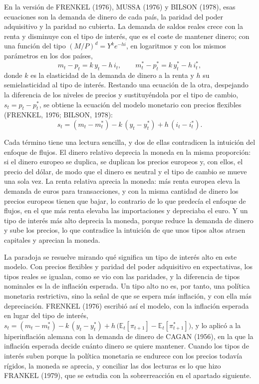 \documentclass[10pt,a4paper]{article}
\begin{document}
En la versión de FRENKEL (1976), MUSSA (1976) y BILSON (1978), esas ecuaciones son la demanda de dinero de cada país, la paridad del poder adquisitivo y la paridad no cubierta. La demanda de saldos reales crece con la renta y disminuye con el tipo de interés, que es el coste de mantener dinero; con una función del tipo $(M/P)^d=Y^k e^{-hi}$, en logaritmos y con los mismos parámetros en los dos países,
$$m_t-p_t=k\,y_t-h\,i_t,\qquad m_t^*-p_t^*=k\,y_t^*-h\,i_t^*,$$
donde $k$ es la elasticidad de la demanda de dinero a la renta y $h$ su semielasticidad al tipo de interés. Restando una ecuación de la otra, despejando la diferencia de los niveles de precios y sustituyéndola por el tipo de cambio, $s_t=p_t-p_t^*$, se obtiene la ecuación del modelo monetario con precios flexibles (FRENKEL, 1976; BILSON, 1978):
$$s_t=(m_t-m_t^*)-k\,(y_t-y_t^*)+h\,(i_t-i_t^*).$$

Cada término tiene una lectura sencilla, y dos de ellas contradicen la intuición del enfoque de flujos. El dinero relativo deprecia la moneda en la misma proporción: si el dinero europeo se duplica, se duplican los precios europeos y, con ellos, el precio del dólar, de modo que el dinero es neutral y el tipo de cambio se mueve una sola vez. La renta relativa aprecia la moneda: más renta europea eleva la demanda de euros para transacciones, y con la misma cantidad de dinero los precios europeos tienen que bajar, lo contrario de lo que predecía el enfoque de flujos, en el que más renta elevaba las importaciones y depreciaba el euro. Y un tipo de interés más alto deprecia la moneda, porque reduce la demanda de dinero y sube los precios, lo que contradice la intuición de que unos tipos altos atraen capitales y aprecian la moneda.

La paradoja se resuelve mirando qué significa un tipo de interés alto en este modelo. Con precios flexibles y paridad del poder adquisitivo en expectativas, los tipos reales se igualan, como se vio con las paridades, y la diferencia de tipos nominales es la de inflación esperada. Un tipo alto no es, por tanto, una política monetaria restrictiva, sino la señal de que se espera más inflación, y con ella más depreciación. FRENKEL (1976) escribió así el modelo, con la inflación esperada en lugar del tipo de interés, $s_t=(m_t-m_t^*)-k\,(y_t-y_t^*)+h\,\big(\mathbb{E}_t[\pi_{t+1}]-\mathbb{E}_t[\pi_{t+1}^*]\big)$, y lo aplicó a la hiperinflación alemana con la demanda de dinero de CAGAN (1956), en la que la inflación esperada decide cuánto dinero se quiere mantener. Cuando los tipos de interés suben porque la política monetaria se endurece con los precios todavía rígidos, la moneda se aprecia, y conciliar las dos lecturas es lo que hizo FRANKEL (1979), que se estudia con la sobrerreacción en el apartado siguiente.
\end{document}
